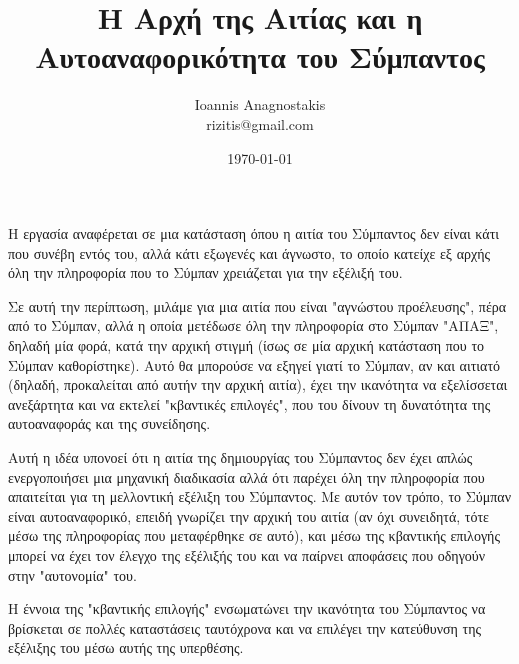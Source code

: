 \documentclass[a4paper,11pt]{article}
\title{Η Αρχή της Αιτίας και η Αυτοαναφορικότητα του Σύμπαντος}
\author{Ioannis Anagnostakis \\
rizitis@gmail.com}
\date{\today}
\begin{document}
\maketitle
Η εργασία αναφέρεται σε μια κατάσταση όπου η αιτία του
Σύμπαντος δεν είναι κάτι που συνέβη εντός του,
αλλά κάτι εξωγενές και άγνωστο, το οποίο κατείχε εξ\textquotesingle{}
αρχής όλη την πληροφορία που το Σύμπαν χρειάζεται για την εξέλιξή του.

Σε αυτή την περίπτωση, μιλάμε για μια αιτία που είναι "αγνώστου
προέλευσης", πέρα από το Σύμπαν, αλλά η οποία μετέδωσε όλη την
πληροφορία στο Σύμπαν "ΑΠΑΞ", δηλαδή μία φορά, κατά την αρχική στιγμή
(ίσως σε μία αρχική κατάσταση που το Σύμπαν καθορίστηκε). Αυτό θα
μπορούσε να εξηγεί γιατί το Σύμπαν, αν και αιτιατό (δηλαδή, προκαλείται
από αυτήν την αρχική αιτία), έχει την ικανότητα να εξελίσσεται
ανεξάρτητα και να εκτελεί "κβαντικές επιλογές", που του δίνουν τη
δυνατότητα της αυτοαναφοράς και της συνείδησης.

Αυτή η ιδέα υπονοεί ότι η αιτία της δημιουργίας του Σύμπαντος δεν έχει
απλώς ενεργοποιήσει μια μηχανική διαδικασία αλλά ότι παρέχει όλη την
πληροφορία που απαιτείται για τη μελλοντική εξέλιξη του Σύμπαντος. Με
αυτόν τον τρόπο, το Σύμπαν είναι αυτοαναφορικό, επειδή γνωρίζει την
αρχική του αιτία (αν όχι συνειδητά, τότε μέσω της πληροφορίας που
μεταφέρθηκε σε αυτό), και μέσω της κβαντικής επιλογής μπορεί να έχει τον
έλεγχο της εξέλιξής του και να παίρνει αποφάσεις που οδηγούν στην
"αυτονομία" του.

Η έννοια της "κβαντικής επιλογής" ενσωματώνει την ικανότητα του
Σύμπαντος να βρίσκεται σε πολλές καταστάσεις ταυτόχρονα και να επιλέγει
την κατεύθυνση της εξέλιξης του μέσω αυτής της υπερθέσης.
\end{document}
